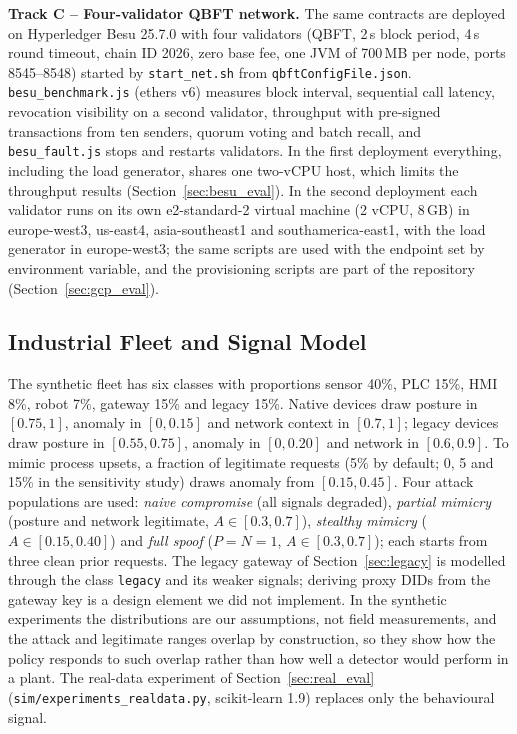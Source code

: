 \textbf{Track C -- Four-validator QBFT network.} The same contracts are deployed on Hyperledger Besu 25.7.0 with four validators (QBFT, 2\,s block period, 4\,s round timeout, chain ID 2026, zero base fee, one JVM of 700\,MB per node, ports 8545--8548) started by \texttt{start\_net.sh} from \texttt{qbftConfigFile.json}. \texttt{besu\_benchmark.js} (ethers v6) measures block interval, sequential call latency, revocation visibility on a second validator, throughput with pre-signed transactions from ten senders, quorum voting and batch recall, and \texttt{besu\_fault.js} stops and restarts validators. In the first deployment everything, including the load generator, shares one two-vCPU host, which limits the throughput results (Section~\ref{sec:besu_eval}). In the second deployment each validator runs on its own e2-standard-2 virtual machine (2 vCPU, 8\,GB) in europe-west3, us-east4, asia-southeast1 and southamerica-east1, with the load generator in europe-west3; the same scripts are used with the endpoint set by environment variable, and the provisioning scripts are part of the repository (Section~\ref{sec:gcp_eval}).

\subsection{Industrial Fleet and Signal Model}\label{sec:devsim}
The synthetic fleet has six classes with proportions sensor 40\%, PLC 15\%, HMI 8\%, robot 7\%, gateway 15\% and legacy 15\%. Native devices draw posture in $[0.75,1]$, anomaly in $[0,0.15]$ and network context in $[0.7,1]$; legacy devices draw posture in $[0.55,0.75]$, anomaly in $[0,0.20]$ and network in $[0.6,0.9]$. To mimic process upsets, a fraction of legitimate requests (5\% by default; 0, 5 and 15\% in the sensitivity study) draws anomaly from $[0.15,0.45]$. Four attack populations are used: \emph{naive compromise} (all signals degraded), \emph{partial mimicry} (posture and network legitimate, $A\in[0.3,0.7]$), \emph{stealthy mimicry} ($A\in[0.15,0.40]$) and \emph{full spoof} ($P=N=1$, $A\in[0.3,0.7]$); each starts from three clean prior requests. The legacy gateway of Section~\ref{sec:legacy} is modelled through the class \texttt{legacy} and its weaker signals; deriving proxy DIDs from the gateway key is a design element we did not implement. In the synthetic experiments the distributions are our assumptions, not field measurements, and the attack and legitimate ranges overlap by construction, so they show how the policy responds to such overlap rather than how well a detector would perform in a plant. The real-data experiment of Section~\ref{sec:real_eval} (\texttt{sim/experiments\_realdata.py}, scikit-learn 1.9) replaces only the behavioural signal.

